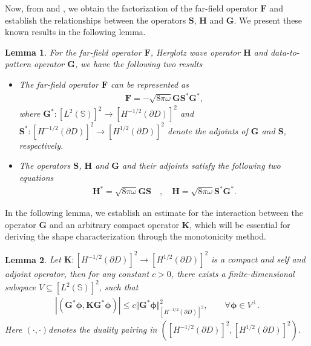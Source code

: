 \documentclass[11pt,reqno,twoside]{amsart}
\newtheorem{lem}{Lemma}[section]
\theoremstyle{definition}
\theoremstyle{remark}
\numberwithin{equation}{section}
\begin{document}
	 	Now, from \cite{Aren01} and \cite{Kress96}, we obtain the factorization of the far-field operator $\mathbf F$ and establish the relationships between the operators $\mathbf S$, $\mathbf H$ and $\mathbf G$. We present these known results in the following lemma.
	\begin{lem}\label{Fdecomposition}
		For the far-field operator $\mathbf F$,  Herglotz wave operator $\mathbf H$ and data-to-pattern operator $\mathbf G$, we have the following two results
		\begin{itemize}
		\item [(1).] The far-field operator $\mathbf F$ can be represented as
	  \begin{align}\label{eq:FarfieldOperatorDecomposition}
		\mathbf F=-\sqrt{8\pi\omega}\mathbf{G S^*G^*},
	  \end{align}
		where $\mathbf{G^*}:\left[L^2\left(\mathbb S\right) \right] ^2 \to \left[H^{-1/2}\left(\partial D\right) \right] ^2$ and $\mathbf{S^*}:\left[H^{-1/2}\left(\partial D\right) \right] ^2 \to \left[H^{1/2}\left(\partial D\right) \right] ^2$ denote the adjoints of $\mathbf G$ and $\mathbf S$, respectively. 
		\item [(2).] The operators $\mathbf S$, $\mathbf H$ and $\mathbf G$ and their adjoints satisfy the following two equations
		\begin{align}\label{eq:HGSoperator}
			\mathbf{H^*}=\sqrt{8\pi\omega}\mathbf{G S}\quad, \quad \mathbf{H}=\sqrt{8\pi\omega}\mathbf{S^* G^*}.
		\end{align}
    	\end{itemize}
	\end{lem}
	
	In the following lemma, we establish an estimate for the interaction between the operator $\mathbf{G}$ and an arbitrary compact operator $\mathbf K$, which will be essential for deriving the shape characterization through the monotonicity method.
	\begin{lem}\label{DatatoPatternProperty}
	Let $\mathbf K:\left[H^{-1/2}\left(\partial D\right) \right] ^2 \to \left[H^{1/2}\left(\partial D\right) \right] ^2$ is a compact and self and adjoint operator, then for any constant $c>0$, there exists a finite-dimensional subspace $V \subseteq \left[L^2\left(\mathbb S\right) \right] ^2$, such that
	\begin{align}\label{eq:DatatoPatternProperty}
		\left|\left( \mathbf G ^* \mathbf {\phi} ,\mathbf {KG}^* \mathbf {\phi}\right) \right| \leq c\Vert \mathbf G ^* \mathbf \phi\Vert _{\left[H^{-1/2}\left(\partial D\right) \right] ^2} ^2, \qquad \forall \mathbf {\phi} \in V^\perp.
	\end{align}
	Here $\left( \cdot,\cdot\right) $denotes the duality pairing in $\left( \left[H^{-1/2}\left(\partial D\right) \right] ^2 ,\left[H^{1/2}\left(\partial D\right) \right] ^2\right) $.
	\end{lem}
\end{document}
